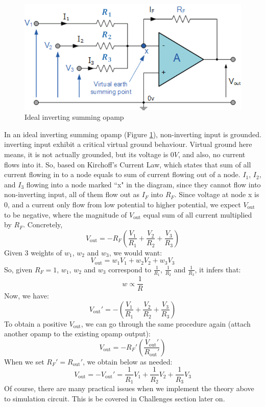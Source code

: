 \begin{figure}[H]
	\centering
	\includegraphics[scale=0.7]{idealsummingopamp.png}
	\caption{Ideal inverting summing opamp}
	\label{fig:noninvertsum}
\end{figure}
In an ideal inverting summing opamp (Figure \ref{fig:noninvertsum}), non-inverting input is grounded. inverting input exhibit a critical virtual ground behaviour. Virtual ground here means, it is not actually grounded, but its voltage is $0V$, and also, no current flows into it. So, based on Kirchoff's Current Law, which states that sum of all current flowing in to a node equals to sum of current flowing out of a node. $I_1$, $I_2$, and $I_3$ flowing into a node marked ``x" in the diagram, since they cannot flow into non-inverting input, all of them flow out as $I_F$ into $R_F$. Since voltage at node x is 0, and a current only flow from low potential to higher potential, we expect $V_{\text{out}}$ to be negative, where the magnitude of $V_{\text{out}}$ equal sum of all current multiplied by $R_F$. Concretely,
$$V_{\text{out}} =-R_F\left( \frac{V_1}{R_1} + \frac{V_2}{R_2} + \frac{V_3}{R_3} \right)$$
Given 3 weights of $w_1$, $w_2$ and $w_3$, we would want: $$\boxed{V_{\text{out}} = w_1V_1+w_2V_2+w_3V_3}$$
So, given $R_F=1$, $w_1$, $w_2$ and $w_3$ correspond to $\frac{1}{R_1}$, $\frac{1}{R_2}$ and $\frac{1}{R_3}$, it infers that: $$w\propto\frac{1}{R}$$
Now, we have:
$$V_{\text{out}}' =-\left( \frac{V_1}{R_1} + \frac{V_2}{R_2} + \frac{V_3}{R_3} \right)$$
To obtain a positive $V_{\text{out}}$, we can go through the same procedure again (attach another opamp to the existing opamp output):
\begin{equation} \label{eq:finalsimplified}
V_{\text{out}} =-R_F'\left( \frac{V_{\text{out}}'}{R_{\text{out}}'} \right)
\end{equation}
When we set $R_F'=R_{\text{out}}'$, we obtain below as needed:
\begin{equation} \label{eq:final}
V_{\text{out}} =-V_{\text{out}}'=\frac{1}{R_1}V_1 + \frac{1}{R_2}V_2 + \frac{1}{R_3}V_3
\end{equation}
Of course, there are many practical issues when we implement the theory above to simulation circuit. This is be covered in Challenges section later on.
